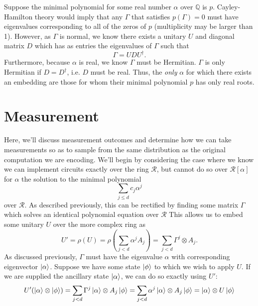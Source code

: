 \documentclass{article}
\theoremstyle{definition}
\theoremstyle{theorem}
\theoremstyle{remark}
\begin{document}
	Suppose the minimal polynomial for some real number $\alpha$ over $\mathbb{Q}$ is $p$. Cayley-Hamilton theory would imply that any $\Gamma$ that satisfies $p(\Gamma)=0$ must have eigenvalues corresponding to all of the zeros of $p$ (multiplicity may be larger than 1). However, as $\Gamma$ is normal, we know there exists a unitary $U$ and diagonal matrix $D$ which has as entries the eigenvalues of $\Gamma$ such that
	\[
	    \Gamma = U D U^\dagger.
	\]
	Furthermore, because $\alpha$ is real, we know $\Gamma$ must be Hermitian. $\Gamma$ is only Hermitian if $D=D^\dagger$, i.e. $D$ must be real. Thus, the \emph{only} $\alpha$ for which there exists an embedding are those for whom their minimal polynomial $p$ has only real roots.
	
	\section{Measurement}
	Here, we'll discuss measurement outcomes and determine how we can take measurements so as to sample from the same distribution as the original computation we are encoding. We'll begin by considering the case where we know we can implement circuits exactly over the ring $\mathcal{R}$, but cannot do so over $\mathcal{R}[\alpha]$ for $\alpha$ the solution to the minimal polynomial
	\[
		\sum_{j\leq d} c_j \alpha^j
	\]
	over $\mathcal{R}$. As described previously, this can be rectified by finding some matrix $\Gamma$ which solves an identical polynomial equation over $\mathcal{R}$ This allows us to embed some unitary $U$ over the more complex ring as
	\[
		U' = \rho(U) = \rho\left(\sum_{j<d}\alpha^j A_j\right) = \sum_{j<d}\Gamma^j\otimes  A_j.
	\]
	As discussed previously, $\Gamma$ must have the eigenvalue $\alpha$ with corresponding eigenvector $\ket{\alpha}$. Suppose we have some state $\ket{\phi}$ to which we wish to apply $U$. If we are supplied the ancillary state $\ket{\alpha}$, we can do so exactly using $U'$:
	\[
		U' (\ket{\alpha}\otimes \ket{\phi}) = \sum_{j<d} \Gamma^j \ket{\alpha}\otimes A_j \ket{\phi} = \sum_{j<d} \alpha^j \ket{\alpha} \otimes A_j\ket{\phi} = \ket{\alpha}\otimes U\ket{\phi}
	\]
\end{document}
